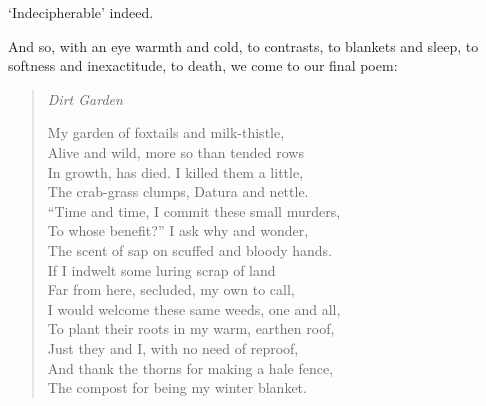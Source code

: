 \documentclass[12pt,oneside]{memoir}
\begin{document}
`Indecipherable' indeed.

And so, with an eye warmth and cold, to contrasts, to blankets and sleep, to softness and inexactitude, to death, we come to our final poem:

\begin{verse}
\emph{Dirt Garden}

My garden of foxtails and milk-thistle, \\
Alive and wild, more so than tended rows \\
In growth, has died. I killed them a little, \\
The crab-grass clumps, Datura and nettle. \\
``Time and time, I commit these small murders, \\
To whose benefit?'' I ask why and wonder, \\
The scent of sap on scuffed and bloody hands. \\
If I indwelt some luring scrap of land \\
Far from here, secluded, my own to call, \\
I would welcome these same weeds, one and all, \\
To plant their roots in my warm, earthen roof, \\
Just they and I, with no need of reproof, \\
And thank the thorns for making a hale fence, \\
The compost for being my winter blanket.

\parencite[5]{leaves}
\end{verse}
\end{document}
